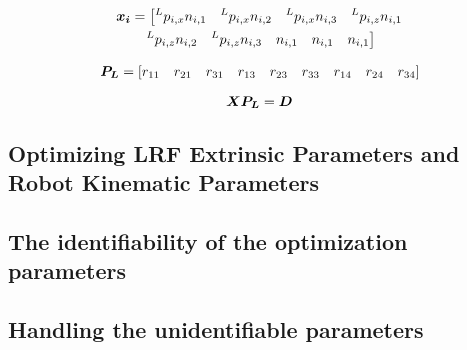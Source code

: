   
\begin{multline*}
  \vb*{x_i} = \left[{^L}p_{i,x}n_{i,1} \quad {^L}p_{i,x}n_{i,2} \quad {^L}p_{i,x}n_{i,3} \quad  {^L}p_{i,z}n_{i,1} \right. \\ 
\left. {^L}p_{i,z}n_{i,2} \quad {^L}p_{i,z}n_{i,3} \quad n_{i,1} \quad n_{i,1}  \quad n_{i,1}  \right]
\end{multline*}

\begin{multline*}
  \vb*{P_L} = \left[r_{11} \quad r_{21} \quad r_{31} \quad r_{13} \quad r_{23} \quad r_{33} \quad r_{14} \quad r_{24}  \quad r_{34} \right] 
\end{multline*}

  \begin{equation*}
  \vb*{X}   \vb*{P_L} = \vb*{D}
  \end{equation*}
  
  







\subsection{Optimizing LRF Extrinsic Parameters and Robot Kinematic Parameters}
\label{sec:second_step}





\subsection{The identifiability of the optimization parameters}
\label{sec:third_step}




\subsection{Handling the unidentifiable parameters}
\label{sec:fourth_step}
